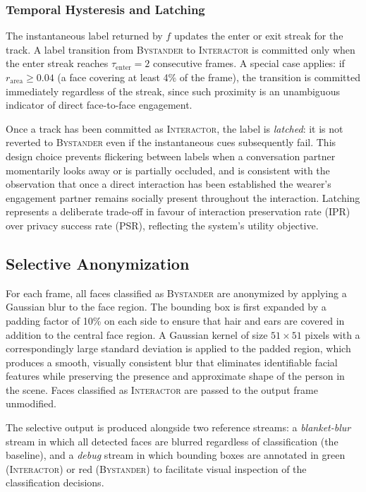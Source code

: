 \subsubsection*{Temporal Hysteresis and Latching}

The instantaneous label returned by $f$ updates the enter or exit streak for the track.
A label transition from \textsc{Bystander} to \textsc{Interactor} is committed only
when the enter streak reaches $\tau_{\mathrm{enter}} = 2$ consecutive frames. A special
case applies: if $r_{\mathrm{area}} \geq 0.04$ (a face covering at least 4\% of the
frame), the transition is committed immediately regardless of the streak, since such
proximity is an unambiguous indicator of direct face-to-face engagement.

Once a track has been committed as \textsc{Interactor}, the label is \emph{latched}: it
is not reverted to \textsc{Bystander} even if the instantaneous cues subsequently fail.
This design choice prevents flickering between labels when a conversation partner
momentarily looks away or is partially occluded, and is consistent with the observation
that once a direct interaction has been established the wearer's engagement partner
remains socially present throughout the interaction. Latching represents a deliberate
trade-off in favour of interaction preservation rate (IPR) over privacy success rate
(PSR), reflecting the system's utility objective.

\subsection{Selective Anonymization}

For each frame, all faces classified as \textsc{Bystander} are anonymized by applying
a Gaussian blur to the face region. The bounding box is first expanded by a padding
factor of 10\% on each side to ensure that hair and ears are covered in addition to the
central face region. A Gaussian kernel of size $51 \times 51$ pixels with a
correspondingly large standard deviation is applied to the padded region, which
produces a smooth, visually consistent blur that eliminates identifiable facial features
while preserving the presence and approximate shape of the person in the scene. Faces
classified as \textsc{Interactor} are passed to the output frame unmodified.

The selective output is produced alongside two reference streams: a \emph{blanket-blur}
stream in which all detected faces are blurred regardless of classification (the
baseline), and a \emph{debug} stream in which bounding boxes are annotated in green
(\textsc{Interactor}) or red (\textsc{Bystander}) to facilitate visual inspection of
the classification decisions.

